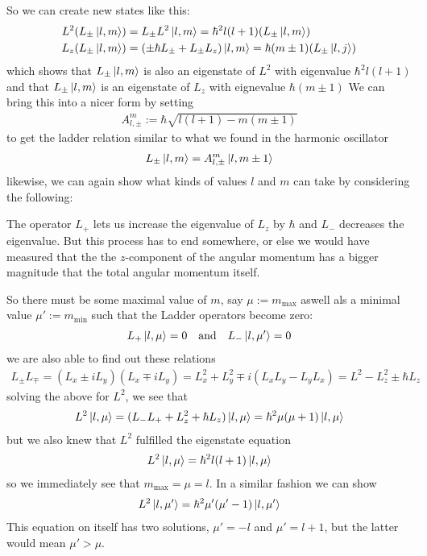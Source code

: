 So we can create new states like this:
\begin{align*}
    L^2(L_{\pm} \ket{l,m}) 
  &= 
    L_{\pm} L^2 \ket{l,m} 
  = 
    \hbar^{2}l(l+1) (L_{\pm} \ket{l,m})
\\
    L_z(L_{\pm}\ket{l,m})
  &= 
    (\pm \hbar L_{\pm} + L_{\pm}L_z) \ket{l,m}
  =
  \hbar(m \pm 1)(L_{\pm} \ket{l,j})
\end{align*}
which shows that $L_{\pm}\ket{l,m}$ is also an eigenstate of $L^{2}$ with eigenvalue $\hbar^{2} l(l+1)$ and that $L_{\pm}\ket{l,m}$ is an eigenstate of $L_z$ with eignevalue $\hbar(m\pm 1)$
We can bring this into a nicer form by setting
\begin{align*}
  A_{l,\pm}^{m} := \hbar \sqrt{l(l+1) - m(m\pm 1)}
\end{align*}
to get the ladder relation similar to what we found in the harmonic oscillator
\begin{align*}
  L_{\pm} \ket{l,m} = A_{l,\pm}^{m}\ket{l,m \pm 1}
\end{align*}
likewise, we can again show what kinds of values $l$ and $m$ can take by considering the following:

The operator $L_{+}$ lets us increase the eigenvalue of $L_z$ by $\hbar$ and $L_-$ decreases the eigenvalue. But this process has to end somewhere, or else we would have measured that the the $z$-component of the angular momentum has a bigger magnitude that the total angular momentum itself.

So there must be some maximal value of $m$, say $\mu:= m_{\max}$ aswell als a minimal value $\mu' := m_{\min}$ such that the Ladder operators become zero:
\begin{align*}
  L_{+}\ket{l,\mu} = 0 \quad \text{and} \quad L_{-} \ket{l,\mu'} = 0
\end{align*}
we are also able to find out these relations
\begin{align*}
  L_{\pm} L_{\mp} = (L_x \pm i L_y)(L_x \mp i L_y) = L_x^2 + L_y^2 \mp i(L_xL_y - L_yL_x) = L^2 - L_z^{2} \pm \hbar L_z
\end{align*}
solving the above for $L^2$, we see that
\begin{align*}
  L^2 \ket{l,\mu} = (L_{-}L_{+}+ L_z^{2} + \hbar L_z) \ket{l,\mu} = \hbar^{2} \mu(\mu + 1) \ket{l,\mu}
\end{align*}
but we also knew that $L^2$ fulfilled the eigenstate equation
\begin{align*}
  L^2 \ket{l,\mu} = \hbar^{2} l (l+1) \ket{l,\mu}
\end{align*}
so we immediately see that $m_{\max} = \mu = l$. In a similar fashion we can show
\begin{align*}
  L^2 \ket{l,\mu'} = \hbar^{2} \mu'(\mu'-1) \ket{l,\mu'}
\end{align*}
This equation on itself has two solutions, $\mu' = -l$ and $\mu' = l+1$, but the latter would mean $\mu' > \mu$.  

